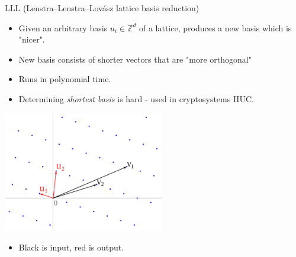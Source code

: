 \documentclass[8pt]{beamer}
\begin{document}
\begin{frame}[label=sec-21]{LLL  (Lenstra–Lenstra–Lovász lattice basis reduction)}
\begin{itemize}
\item Given an arbitrary basis $u_i \in \mathbb{Z}^d$ of a lattice, produces a new basis which is "nicer".
\item New basis consists of shorter vectors that are "more orthogonal"
\item Runs in polynomial time.
\item Determining \textit{shortest basis} is hard - used in cryptosystems IIUC.
\end{itemize}

\begin{center}
\includegraphics[width=7cm, keepaspectratio]{res/lattice-reduction}
\end{center}
\begin{itemize}
\item Black is input, red is output.
\end{itemize}
\end{frame}
\end{document}
